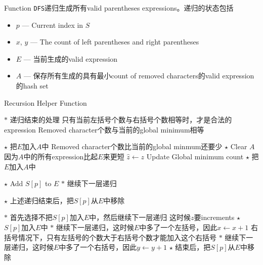 Function \texttt{DFS}递归生成所有valid parentheses expressions。递归的状态包括
\begin{itemize}
	\item $p$ --- Current index in $S$
	\item $x$, $y$ --- The count of left parentheses and right parentheses
	\item $E$ --- 当前生成的valid expression
	\item $A$ --- 保存所有生成的具有最小count of removed characters的valid expression的hash set
\end{itemize}
\begin{algorithm}[H]
	\caption{Recursion Helper Function}
	\begin{algorithmic}[1]
		\State $\ast$ 递归结束的处理
		 \Comment 只有当前左括号个数与右括号个数相等时，才是合法的expression
		 \Comment Removed character个数与当前的global
		 minimum相等
		\end{algorithmic}
	\end{algorithm}
\begin{algorithm}[H]
	\begin{algorithmic}[1]
				 \State $\star$ 把$E$加入$A$中
		 \Comment Removed character个数比当前的global minmum还要少
		\State $\star$ Clear $A$ 因为$A$中的所有expression比起$E$来更短
		\State $\hat{z}\gets z$ \Comment Update Global minimum count
		\State $\star$ 把$E$加入$A$中
		\EndIf
		\EndIf
		\State \Return 
		\EndIf
		
		\State $\star$ Add $S[p]$ to $E$
		\State $\ast$ 继续下一层递归
		
				\State {}
		\State $\star$ 上述递归结束后，把$S[p]$从$E$中移除
		
				\Else
		\State $\ast$ 首先选择不把$S[p]$加入$E$中，然后继续下一层递归
		\State {} \Comment 这时候$z$要increments
		\State $\star$ $S[p]$加入$E$中
		\State $\ast$ 继续下一层递归，这时候$E$中多了一个左括号，因此$x\gets x+1$
		\State {}
		 \Comment 右括号情况下，只有左括号的个数大于右括号个数才能加入这个右括号
		\State $\ast$ 继续下一层递归，这时候$E$中多了一个右括号，因此$y\gets y+1$
		\State {}
		\EndIf
		\State $\star$ 结束后，把$S[p]$从$E$中移除
		\EndIf
		\EndFunction
	\end{algorithmic}
\end{algorithm}

